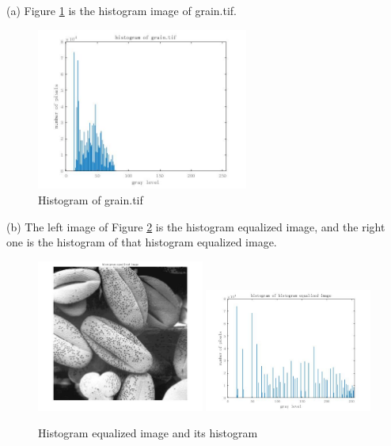 \problem{}
(a) Figure \ref{fig:p1a} is the histogram image of grain.tif.\\

\begin{figure}[htbp]
    \centering
	\includegraphics[width=0.62\textwidth]{../images/p1a_historgram_origin.jpg}
    \caption{Histogram of grain.tif}
    \label{fig:p1a}
\end{figure}

(b) The left image of Figure \ref{fig:p1b} is the histogram equalized image, and the right one is 
the histogram of that histogram equalized image.\\

\begin{figure}[htbp]
    \centering
	\includegraphics[width=0.49\textwidth]{../images/p1b_hist_eq_image.jpg}
	\includegraphics[width=0.49\textwidth]{../images/p1b_historgram_hist_eq.jpg}
    \caption{Histogram equalized image and its histogram}
    \label{fig:p1b}
\end{figure}

